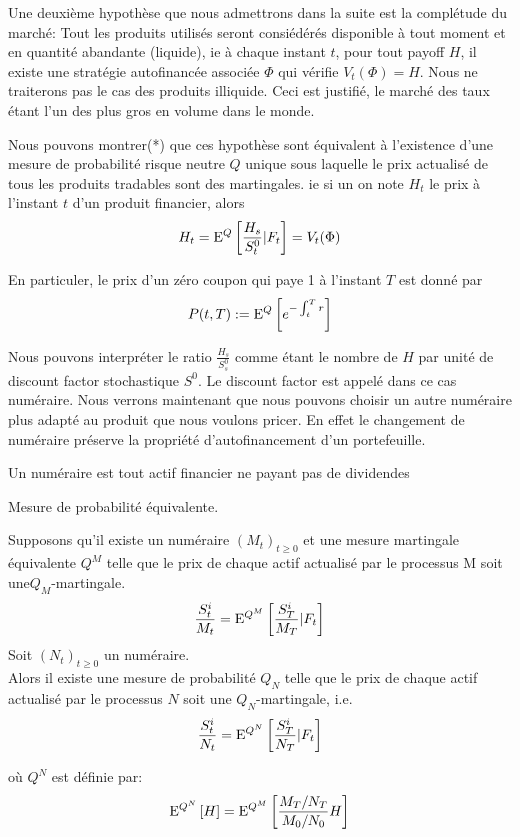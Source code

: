 Une deuxième hypothèse que nous admettrons dans la suite est la complétude du marché: Tout les produits utilisés seront consiédérés disponible à tout moment et en quantité abandante (liquide), ie à chaque instant $t$, pour tout payoff $H$, il existe une stratégie autofinancée associée $\Phi$ qui vérifie $V_t( \Phi ) = H$. Nous ne traiterons pas le cas des produits illiquide. Ceci est justifié, le marché des taux étant l'un des plus gros en volume dans le monde.

Nous pouvons montrer(*) que ces hypothèse sont équivalent à l'existence d'une mesure de probabilité risque neutre $Q$ unique sous laquelle le prix actualisé de tous les produits tradables sont des martingales. ie si un on note $H_t$ le prix à l'instant $t$ d'un produit financier, alors
$$H_t =\mathrm{E}^Q \left[  \frac{H_s}{S^0_t} | F_t  \right] = V_t(\Phi)$$

En particuler, le prix d'un zéro coupon qui paye 1 à l'instant $T$ est donné par
$$ P(t, T) := \mathrm{E}^Q \left[   e^{-\int_t^T r}  \right] $$


Nous pouvons interpréter le ratio $\frac{H_s}{ S^0_s}$ comme étant le nombre  de $H$ par unité de discount factor stochastique $S^0$. Le discount factor est appelé dans ce cas numéraire. Nous verrons maintenant que nous pouvons choisir un autre numéraire plus adapté au produit que nous voulons pricer.
En effet le changement de numéraire préserve la propriété d'autofinancement d'un portefeuille.

\begin{defn} Un numéraire est tout actif financier ne payant pas de dividendes \end{defn}

\begin{defn} Mesure de probabilité équivalente.
  
Supposons qu’il existe un numéraire $(M_t )_{t \geq 0}$ et une mesure martingale équivalente $Q^M$ telle que le prix de chaque actif actualisé par le processus M soit une$Q_M$-martingale. 
$$ \frac{S^i_t}{M_t} = \mathrm{E}^{Q^M} \left[  \frac{S^i_T}{M_T} | F_t \right]$$
Soit $(N_t )_{t \geq 0}$ un numéraire. \\
Alors il existe une mesure de probabilité $Q_N$ telle que le prix de chaque actif actualisé par le processus $N$ soit une $Q_N$-martingale, i.e.
$$ \frac{S^i_t}{N_t} = \mathrm{E}^{Q^N} \left[  \frac{S^i_T}{N_T} | F_t \right]$$

où $Q^N$ est définie par:
$$\mathrm{E}^{Q^N} \left[  H  \right] = \mathrm{E}^{Q^M} \left[  \frac{ M_T/N_T}{M_0/N_0} H \right]$$

\end{defn}

